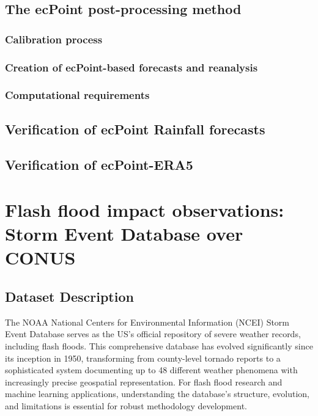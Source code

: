 \subsection{The ecPoint post-processing method}

\subsubsection{Calibration process}

\subsubsection{Creation of ecPoint-based forecasts and reanalysis}

\subsubsection{Computational requirements}


\subsection{Verification of ecPoint Rainfall forecasts}


\subsection{Verification of ecPoint-ERA5}



\section{Flash flood impact observations: Storm Event Database over CONUS}
\label{storm_event_database}

\subsection{Dataset Description}

The NOAA National Centers for Environmental Information (NCEI) Storm Event Database serves as the US's official repository of severe weather records, including flash floods. This comprehensive database has evolved significantly since its inception in 1950, transforming from county-level tornado reports to a sophisticated system documenting up to 48 different weather phenomena with increasingly precise geospatial representation. For flash flood research and machine learning applications, understanding the database's structure, evolution, and limitations is essential for robust methodology development. 

